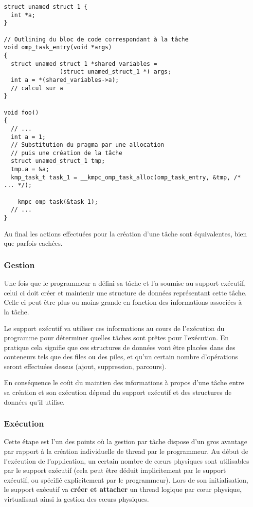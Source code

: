 \begin{lstlisting}
struct unamed_struct_1 {
  int *a;
}

// Outlining du bloc de code correspondant à la tâche
void omp_task_entry(void *args)
{
  struct unamed_struct_1 *shared_variables =
                (struct unamed_struct_1 *) args;
  int a = *(shared_variables->a);
  // calcul sur a
}

void foo()
{
  // ...
  int a = 1;
  // Substitution du pragma par une allocation
  // puis une création de la tâche
  struct unamed_struct_1 tmp;
  tmp.a = &a;
  kmp_task_t task_1 = __kmpc_omp_task_alloc(omp_task_entry, &tmp, /* ... */);

  __kmpc_omp_task(&task_1);
  // ...
}
\end{lstlisting}

Au final les actions effectuées pour la création d'une tâche sont équivalentes, bien que parfois cachées.


\subsubsection{Gestion}

Une fois que le programmeur a défini sa tâche et l'a soumise au support exécutif, celui ci doit créer et maintenir une structure de données représentant cette tâche.
Celle ci peut être plus ou moins grande en fonction des informations associées à la tâche.

Le support exécutif va utiliser ces informations au cours de l'exécution du programme pour déterminer quelles tâches sont prêtes pour l'exécution.
En pratique cela signifie que ces structures de données vont être placées dans des conteneurs tels que des files ou des piles, et qu'un certain nombre d'opérations seront effectuées dessus (ajout, suppression, parcours).

En conséquence le coût du maintien des informations à propos d'une tâche entre sa création et son exécution dépend du support exécutif et des structures de données qu'il utilise.


\subsubsection{Exécution}

Cette étape est l'un des points où la gestion par tâche dispose d'un gros avantage par rapport à la création individuelle de thread par le programmeur.
Au début de l'exécution de l'application, un certain nombre de cœurs physiques sont utilisables par le support exécutif (cela peut être déduit implicitement par le support exécutif, ou spécifié explicitement par le programmeur).
Lors de son initialisation, le support exécutif va \textbf{créer et attacher} un thread logique par cœur physique, virtualisant ainsi la gestion des cœurs physiques.

